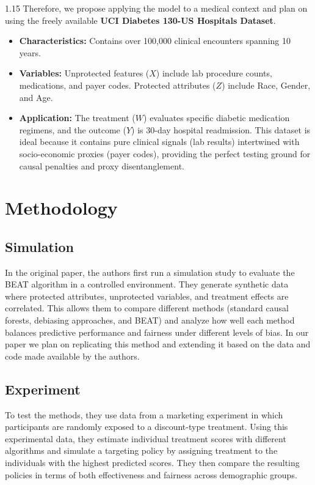 \documentclass[11pt, a4paper]{article}
\begin{document}
\begin{spacing}{1.15}
Therefore, we propose applying the model to a medical context and plan on using the freely available \textbf{UCI Diabetes 130-US Hospitals Dataset}. 

\begin{itemize}
    \item \textbf{Characteristics:} Contains over 100,000 clinical encounters spanning 10 years. 
    \item \textbf{Variables:} Unprotected features ($X$) include lab procedure counts, medications, and payer codes. Protected attributes ($Z$) include Race, Gender, and Age. 
    \item \textbf{Application:} The treatment ($W$) evaluates specific diabetic medication regimens, and the outcome ($Y$) is 30-day hospital readmission. This dataset is ideal because it contains pure clinical signals (lab results) intertwined with socio-economic proxies (payer codes), providing the perfect testing ground for causal penalties and proxy disentanglement.
\end{itemize}


\section{Methodology}
\subsection*{Simulation}

In the original paper, the authors first run a simulation study to evaluate the BEAT algorithm in a controlled environment. They generate synthetic data where protected attributes, unprotected variables, and treatment effects are correlated. This allows them to compare different methods (standard causal forests, debiasing approaches, and BEAT) and analyze how well each method balances predictive performance and fairness under different levels of bias.
In our paper we plan on replicating this method and extending it based on the data and code made available by the authors.

\subsection*{Experiment}
To test the methods, they use data from a marketing experiment in which participants are randomly exposed to a discount-type treatment. Using this experimental data, they estimate individual treatment scores with different algorithms and simulate a targeting policy by assigning treatment to the individuals with the highest predicted scores. They then compare the resulting policies in terms of both effectiveness and fairness across demographic groups.


\end{spacing}
\end{document}

